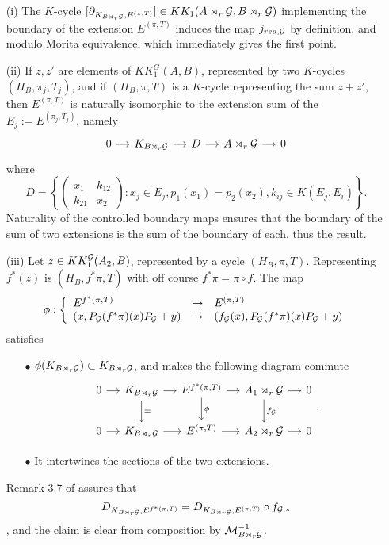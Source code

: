 \begin{dem}
\begin{enumerate}

\item[(i)]The $K$-cycle $[\partial_{K_{B\rtimes_r \mathcal G},E^{(\pi,T)}}]\in KK_1(A\rtimes_r \mathcal G, B\rtimes_r \mathcal G)$ implementing the boundary of the extension $E^{(\pi,T)}$ induces the map $j_{red,\mathcal G}$ by definition, and modulo Morita equivalence, which immediately gives the first point.

\item[(ii)] If $z,z'$ are elements of $KK_1^G(A,B)$, represented by two $K$-cycles $(H_B,\pi_j,T_j)$, and if $(H_B,\pi,T)$ is a $K$-cycle representing the sum $z+z'$, then $E^{(\pi,T)}$ is naturally isomorphic to the extension sum of the $E_j:=E^{(\pi_j,T_j)}$, namely
\[\begin{tikzcd}[column sep = small]
0\arrow{r} & K_{B\rtimes_r \G} \arrow{r} & D \arrow{r} & A\rtimes_r \G \arrow{r} & 0
\end{tikzcd}\]
where 
\[D=\left\{\begin{pmatrix}x_1 & k_{12}\\ k_{21} & x_2\end{pmatrix} : x_j\in E_j , p_1(x_1)=p_2(x_2), k_{ij}\in K(E_j,E_i)\right\}.\]
Naturality of the controlled boundary maps \cite{OY2} ensures that the boundary of the sum of two extensions is the sum of the boundary of each, thus the result.
\item[(iii)] Let $z\in KK_1^\mathcal G(A_2,B)$, represented by a cycle $(H_B,\pi,T)$. Representing $f^*(z)$ is $(H_B,f^*\pi,T)$ with off course $f^*\pi=\pi \circ f$. The map 
\[\phi : \left\{\begin{array}{lll} E^{f^*(\pi,T)} & \rightarrow & E^{(\pi,T)} \\
( x, P_\mathcal G(f^*\pi)(x)P_\mathcal G+y) & \rightarrow & ( f_\mathcal G(x), P_\mathcal G(f^*\pi)(x)P_\mathcal G+y) \end{array}\right. \]
satisfies
\begin{enumerate}
\item[$\bullet$] $\phi(K_{B\rtimes_r \mathcal G})\subset K_{B\rtimes_r \mathcal G}$, and makes the following diagram commute
\[\begin{tikzcd}[column sep = small]
0\arrow{r} & K_{B\rtimes_r \G}\arrow{r}\arrow{d}{=} & E^{f^*(\pi,T)} \arrow{r}\arrow{d}{\phi}& A_1\rtimes_r \G\arrow{r}\arrow{d}{f_\G} & 0\\
0\arrow{r} & K_{B\rtimes_r \G}\arrow{r} & E^{(\pi,T)} \arrow{r}& A_2\rtimes_r \G\arrow{r} & 0
\end{tikzcd}.\]
\item[$\bullet$] It intertwines the sections of the two extensions.
\end{enumerate}
Remark $3.7$ of \cite{OY2} assures that \[D_{K_{B\rtimes_r \mathcal G}, E^{f^*(\pi,T)} } =  D_{K_{B\rtimes_r \mathcal G}, E^{(\pi,T)} }\circ f_{\mathcal G,*}\], and the claim is clear from composition by $\mathcal M_{B\rtimes_r \mathcal G}^{-1}$.


\end{enumerate}
\end{dem}
